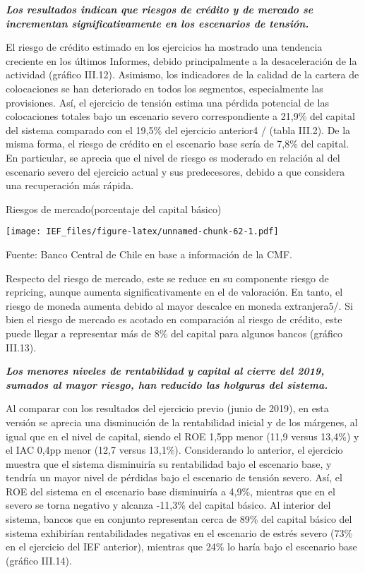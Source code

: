 \documentclass[
]{book}
\begin{document}
\textbf{\emph{Los resultados indican que riesgos de crédito y de mercado se incrementan significativamente en los escenarios de tensión.}}

El riesgo de crédito estimado en los ejercicios ha mostrado una tendencia
creciente en los últimos Informes, debido principalmente a la desaceleración de
la actividad (gráfico III.12). Asimismo, los indicadores de la calidad de la cartera
de colocaciones se han deteriorado en todos los segmentos, especialmente
las provisiones. Así, el ejercicio de tensión estima una pérdida potencial de las
colocaciones totales bajo un escenario severo correspondiente a 21,9\% del
capital del sistema comparado con el 19,5\% del ejercicio anterior4 / (tabla III.2).
De la misma forma, el riesgo de crédito en el escenario base sería de 7,8\% del
capital. En particular, se aprecia que el nivel de riesgo es moderado en relación
al del escenario severo del ejercicio actual y sus predecesores, debido a que
considera una recuperación más rápida.

Riesgos de mercado(porcentaje del capital básico)

\texttt{[image: IEF\_files/figure-latex/unnamed-chunk-62-1.pdf]}

Fuente: Banco Central de Chile en base a información de la CMF.

Respecto del riesgo de mercado, este se reduce en su componente riesgo de
repricing, aunque aumenta significativamente en el de valoración. En tanto, el riesgo
de moneda aumenta debido al mayor descalce en moneda extranjera5/. Si bien el riesgo de mercado es acotado en comparación al riesgo de crédito, este puede llegar a representar más de 8\% del capital para algunos bancos (gráfico III.13).

\textbf{\emph{Los menores niveles de rentabilidad y capital al cierre del 2019, sumados al mayor riesgo, han reducido las holguras del sistema.}}

Al comparar con los resultados del ejercicio previo (junio de 2019), en esta
versión se aprecia una disminución de la rentabilidad inicial y de los márgenes,
al igual que en el nivel de capital, siendo el ROE 1,5pp menor (11,9 versus
13,4\%) y el IAC 0,4pp menor (12,7 versus 13,1\%). Considerando lo anterior,
el ejercicio muestra que el sistema disminuiría su rentabilidad bajo el escenario
base, y tendría un mayor nivel de pérdidas bajo el escenario de tensión severo.
Así, el ROE del sistema en el escenario base disminuiría a 4,9\%, mientras que
en el severo se torna negativo y alcanza -11,3\% del capital básico. Al interior
del sistema, bancos que en conjunto representan cerca de 89\% del capital
básico del sistema exhibirían rentabilidades negativas en el escenario de estrés
severo (73\% en el ejercicio del IEF anterior), mientras que 24\% lo haría bajo el
escenario base (gráfico III.14).
\end{document}
